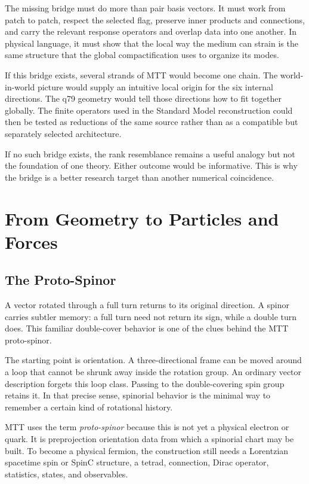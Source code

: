 \documentclass[11pt,openany]{book}
\begin{document}
The missing bridge must do more than pair basis vectors. It must work from
patch to patch, respect the selected flag, preserve inner products and
connections, and carry the relevant response operators and overlap data into
one another. In physical language, it must show that the local way the medium
can strain is the same structure that the global compactification uses to
organize its modes.

If this bridge exists, several strands of MTT would become one chain. The
world-in-world picture would supply an intuitive local origin for the six
internal directions. The q79 geometry would tell those directions how to fit
together globally. The finite operators used in the Standard Model
reconstruction could then be tested as reductions of the same source rather
than as a compatible but separately selected architecture.

If no such bridge exists, the rank resemblance remains a useful analogy but
not the foundation of one theory. Either outcome would be informative. This
is why the bridge is a better research target than another numerical
coincidence.

\part{From Geometry to Particles and Forces}

\chapter{The Proto-Spinor}

A vector rotated through a full turn returns to its original direction. A
spinor carries subtler memory: a full turn need not return its sign, while a
double turn does. This familiar double-cover behavior is one of the clues
behind the MTT proto-spinor.

The starting point is orientation. A three-directional frame can be moved
around a loop that cannot be shrunk away inside the rotation group. An
ordinary vector description forgets this loop class. Passing to the
double-covering spin group retains it. In that precise sense, spinorial
behavior is the minimal way to remember a certain kind of rotational history.

MTT uses the term \emph{proto-spinor} because this is not yet a physical
electron or quark. It is preprojection orientation data from which a
spinorial chart may be built. To become a physical fermion, the construction
still needs a Lorentzian spacetime spin or SpinC structure, a tetrad,
connection, Dirac operator, statistics, states, and observables.
\end{document}
